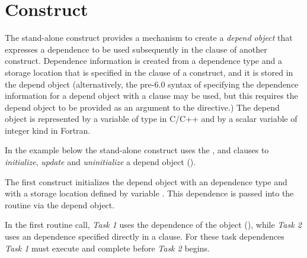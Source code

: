 \section{ Construct}
\label{sec:depobj}

The stand-alone  construct provides a mechanism 
to create a \emph{depend object} that expresses a dependence to be 
used subsequently in the  clause of another construct.
Dependence information is created from a dependence type and a storage location
that is specified in the  clause of a  construct,
and it is stored in the depend object (alternatively, the pre-6.0
syntax of specifying the dependence information for a depend
object with a  clause may be used, but this
requires the depend object to be provided as an argument
to the directive.)
The depend object is represented by a variable of type  
in C/C++ and by a scalar variable of integer kind  in Fortran.


In the example below the stand-alone  construct uses the 
,  and  clauses to 
\emph{initialize}, \emph{update} and \emph{uninitialize}
a depend object ().

The first  construct initializes the  
depend object with 
an  dependence type and with a storage
location defined by variable .  
This dependence is passed into the  
routine via the  depend object.

In the first  routine call, \emph{Task 1} uses
the dependence of the object (), 
while \emph{Task 2} uses an  dependence specified 
directly in a  clause.
For these task dependences \emph{Task 1} must execute and 
complete before \emph{Task 2} begins.


